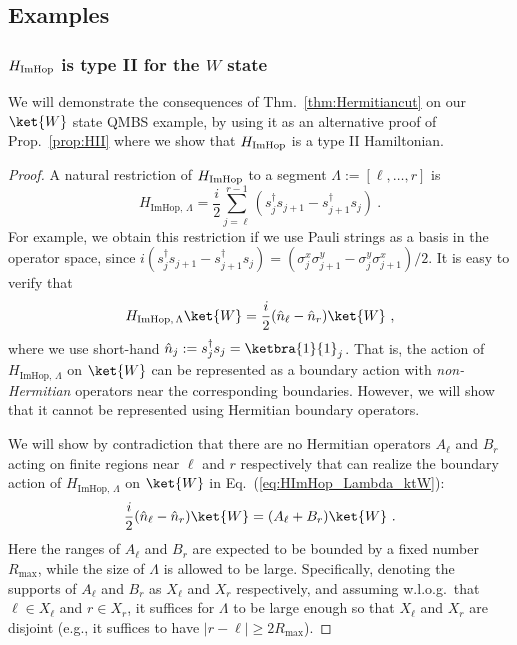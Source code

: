 \documentclass[prx,letterpaper,aps,superscriptaddress,floatfix,twocolumn,nofootinbib]{revtex4-2}
\theoremstyle{definition}
\newcommand{\defn}{:=}
\newcommand{\ktW}{\ket{W}}
\newcommand{\HImHopLambda}{H_{\text{ImHop},\, \Lambda}}
\begin{document}
%
\subsection{Examples}
%
\subsubsection{$H_{\rm ImHop}$ is type II for the $W$ state}
\label{sec:CuttingHImHop}
We will demonstrate the consequences of Thm.~\ref{thm:Hermitiancut} on our $\ket{W}$ state QMBS example, by using it as an alternative proof of Prop.~\ref{prop:HII} where we show that $H_{\rm ImHop}$ is a type II Hamiltonian.
%

\begin{proof}
%
A natural restriction of $H_{\rm ImHop}$ to a segment $\Lambda \defn [\ell, \dots, r]$ is
\begin{equation}
\HImHopLambda = \frac{i}{2} \sum_{j=\ell}^{r-1} \left( s_j^\dagger s_{j+1} -s_{j+1}^\dagger s_j \right) ~.
\end{equation}
%
For example, we obtain this restriction if we use Pauli strings as a basis in the operator space, since $i (s_j^\dagger s_{j+1} - s_{j+1}^\dagger s_j) = (\sigma_j^x \sigma_{j+1}^y - \sigma_j^y \sigma_{j+1}^x)/2$.
It is easy to verify that
\begin{equation}
\HImHopLambda \ktW = \frac{i}{2} (\hat{n}_\ell - \hat{n}_r) \ktW ~,
\label{eq:HImHop_Lambda_ktW}
\end{equation}
where we use short-hand $\hat{n}_j \defn s_j^\dagger s_j = \ketbra{1}{1}_j$.
That is, the action of $\HImHopLambda$ on $\ktW$ can be represented as a boundary action with {\it non-Hermitian} operators near the corresponding boundaries.
However, we will show that it cannot be represented using Hermitian boundary operators.
%

%
We will show by contradiction that there are no Hermitian operators $A_\ell$ and $B_r$ acting on finite regions near $\ell$ and $r$ respectively that can realize the boundary action of $\HImHopLambda$ on $\ktW$ in Eq.~(\ref{eq:HImHop_Lambda_ktW}):
\begin{equation}
\frac{i}{2} (\hat{n}_\ell - \hat{n}_r) \ktW = (A_\ell + B_r) \ktW ~.
\label{eq:HImHop_Lambda_ktW_AB}
\end{equation}
%
Here the ranges of $A_\ell$ and $B_r$ are expected to be bounded by a fixed number $R_{\text{max}}$, while the size of $\Lambda$ is allowed to be large.
%
Specifically, denoting the supports of $A_\ell$ and $B_r$ as $X_\ell$ and $X_r$ respectively, and assuming w.l.o.g.\ that $\ell \in X_\ell$ and $r \in X_r$, it suffices for $\Lambda$ to be large enough so that $X_\ell$ and $X_r$ are disjoint (e.g., it suffices to have $|r - \ell| \geq 2 R_{\text{max}}$).
%


\end{proof}
\end{document}
